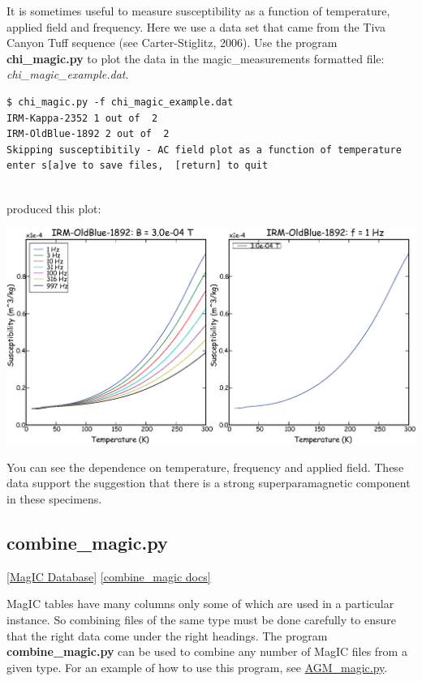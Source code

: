 \documentclass[11pt]{book}
\begin{document}
{{It is sometimes useful to measure susceptibility as a function of temperature, applied field and frequency.   Here we use a data set that came from the Tiva Canyon Tuff sequence (see Carter-Stiglitz,  2006).  \nocite{carterstiglitz06}    Use the program {\bf chi\_magic.py} to plot the data in the magic\_measurements formatted file: {\it chi\_magic\_example.dat}.

\begin{verbatim}
$ chi_magic.py -f chi_magic_example.dat
IRM-Kappa-2352 1 out of  2
IRM-OldBlue-1892 2 out of  2
Skipping susceptibitily - AC field plot as a function of temperature
enter s[a]ve to save files,  [return] to quit


\end{verbatim}

\noindent produced this plot:


  \includegraphics[width=15cm]{EPSfiles/chi-magic.eps}

You can see the dependence on temperature, frequency and applied field.  These data support the suggestion that there is a strong superparamagnetic component in these specimens.



\subsection {combine\_magic.py} \href{#MagICDatabase}{[MagIC Database]}
\label{ex:combine_magic}
\href{https://github.com/PmagPy/PmagPy/blob/master/programs/combine_magic.py}{[combine\_magic docs]}

MagIC tables have many columns only some of which are used in a particular instance.  So combining files of the same type must be done carefully to ensure that the right data come under the right headings.  The program {\bf combine\_magic.py} can be used to combine any number of MagIC files from a given type.    For an example of how to use this program, see \href{#AGM_magic.py}{AGM\_magic.py}.



}}
\end{document}
